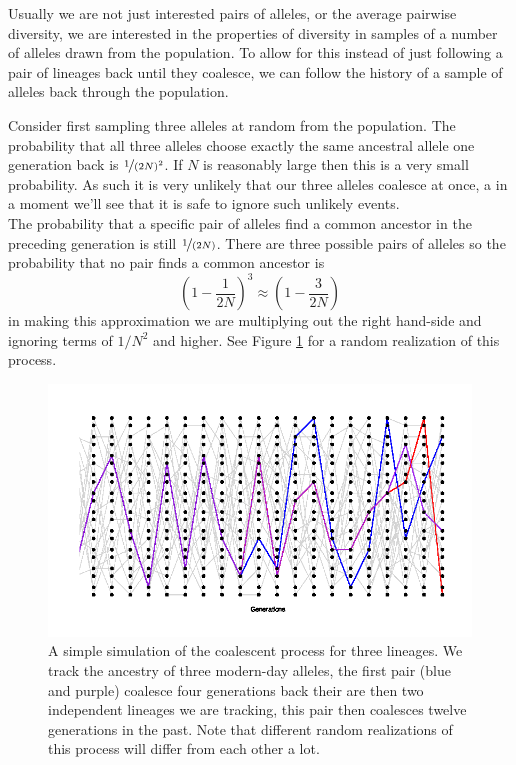 Usually we are not just interested pairs of alleles, or the
average pairwise diversity, we are interested in the properties of
diversity in samples of a number of alleles drawn from the population.  
To allow for this instead of just following a pair of lineages back until they
coalesce, we can follow the history of a sample of alleles back
through the population.

Consider first sampling three alleles at random from the population. The
probability that all three alleles choose exactly the same ancestral allele one
generation back is $\nicefrac{1}{(2N)^2}$. If $N$ is reasonably large then this
is a very small probability. As such it is very unlikely that our three alleles
coalesce at once, a in a moment we'll see that it is safe to ignore such
unlikely events. \\

The probability that a specific pair of alleles find a common ancestor in the
preceding generation is still $\nicefrac{1}{(2N)}$. There are three possible pairs of
alleles so the probability that no pair finds a common ancestor is
\begin{equation}
\left(1-\frac{1}{2N} \right)^3 \approx \left( 1- \frac{3}{2N} \right)
\end{equation}
in making this approximation we are multiplying out the right hand-side
and ignoring terms of $1/N^2$ and higher. See
Figure \ref{fig:Coalescent_simulation_3} for a random realization of this process. \\


\begin{figure}
\begin{center}
  \includegraphics[width = \textwidth]{figures/Coalescent_3.png}
\end{center}
\caption{A simple simulation of the coalescent process for three
  lineages. We track the ancestry of 
  three modern-day alleles, the first pair (blue and purple) coalesce four generations back 
  their are then two independent lineages we are tracking, this pair
  then coalesces twelve generations in the past. Note that different
  random realizations of this process will differ from each other a lot.} \label{fig:Coalescent_simulation_3}
\end{figure}


